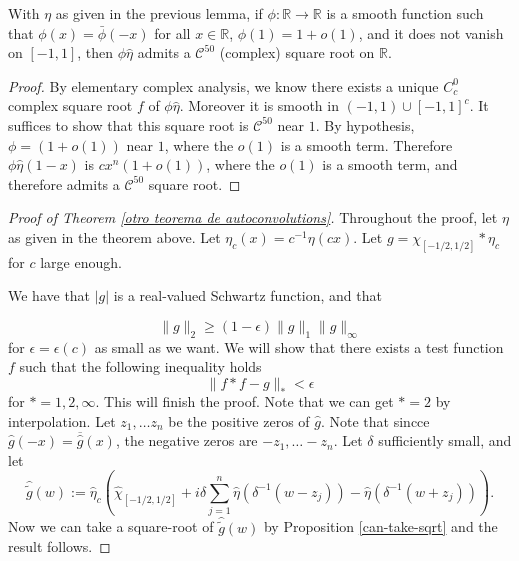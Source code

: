 \begin{prop}
\label{can-take-sqrt}With $\eta$ as given in the previous lemma, if $\phi:\mathbb R\to \mathbb R$ is a smooth function such that $\phi(x) = \bar \phi(-x)$ for all $x\in\mathbb{R}$, $\phi(1)=1+o(1)$, and it does not vanish on $[-1,1]$, then $\phi \hat \eta$ admits a $\mathcal C^{50}$ (complex) square root on $\mathbb R$.
\end{prop}

\begin{proof}
By elementary complex analysis, we know there exists a unique $C^{0}_c$ complex square root  $f$ of $\phi \hat \eta $. Moreover it is smooth in $(-1,1)\cup [-1,1]^c$. It suffices to show that this square root is $\mathcal C^{50}$ near $1$. By hypothesis, $\phi = (1+o(1))$ near $1$, where the $o(1)$ is a smooth term. Therefore $\phi \hat \eta (1-x)$ is $cx^{n}(1+o(1))$, where the $o(1)$ is a smooth term, and therefore admits a $\mathcal C^{50}$ square root.
\end{proof}

\begin{proof}[Proof of Theorem \ref{otro teorema de autoconvolutions}]
Throughout the proof, let $\eta$ as given in the theorem above. Let $\eta_c(x) = c^{-1}\eta(c x)$. Let {$g = \chi_{[-1/2,1/2]}\ast \eta_c$} for $c$ large enough. 

We have that $|g|$ is a real-valued Schwartz function, and that 

\begin{equation}
    \|g\|_{2} \ge (1-\epsilon)
     \|g\|_{1}
     \|g\|_{\infty}
\end{equation}
for $\epsilon=\epsilon(c)$ as small as we want. We will show that there exists a test function $f$ such that the following inequality holds
$$
\|f\ast f- g\|_*<\epsilon
$$
for $*=1,2,\infty$. This will finish the proof. Note that we can  get $*=2$ by interpolation. Let $z_1,\dots z_n$ be the positive zeros of $\hat g$. Note that sincce $\hat g(-x) = \overline{\hat g}(x)$, the negative zeros are $-z_1,\dots -z_n$. Let $\delta$ sufficiently small, %
and let 
$$
\hat {\tilde g}(w):= \hat \eta_c \left(\hat \chi_{[-1/2,1/2]} +i\delta  \sum_{j=1}^n  \hat \eta(\delta^{-1}(w-z_j))-\hat \eta(\delta^{-1}(w+z_j))\right).
$$
Now we can take a square-root of $\hat {\tilde g}(w)$ by Proposition \ref{can-take-sqrt} and the result follows.
\end{proof}
